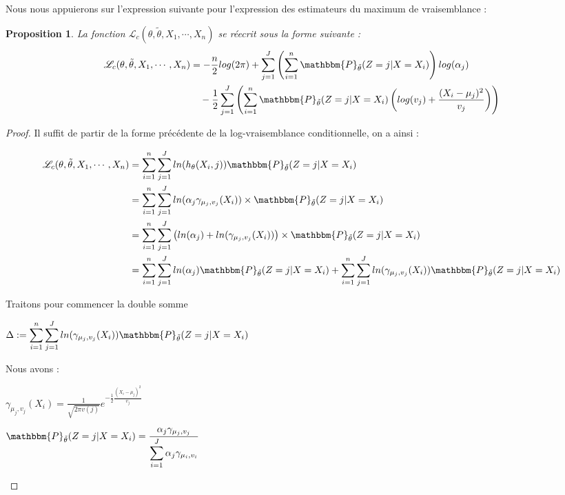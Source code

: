 \documentclass[frenchb]{report}
\newcommand{\1}{\mathbbm{1}}
\newcommand{\prob}{\mathbbm{P}}
\newcommand{\lv}{\mathcal{L}}
\newcommand{\thetat}{\tilde{\theta}}
\newtheorem{prop}{Proposition}
\theoremstyle{definition}\newtheorem{defn}{Définition}
\theoremstyle{definition}\newtheorem{exm}{Exemple}
\theoremstyle{definition}\newtheorem{nota}{Notation}
\theoremstyle{definition}\newtheorem{rem}{Remarque}
\begin{document}
Nous nous appuierons sur l'expression suivante pour l'expression des estimateurs du maximum de vraisemblance :

\begin{prop} La fonction $\lv_{c}(\theta, \thetat, X_1, \cdots, X_n)$ se réecrit sous la forme suivante : 
\begin{align*}
 \lv_{c}(\theta, \thetat, X_1, \cdots, X_n) &= -\frac{n}{2}log(2\pi)+\sum_{j=1}^J \left(\sum_{i = 1}^n \prob_{\thetat}(Z= j|X=X_i)\right) log(\alpha_j)\\
&~~~-\frac{1}{2}\sum_{j=1}^J\left(\sum_{i=1}^n  \prob_{\thetat}(Z=j|X=X_i)\left(log(v_j)+\frac{(X_i-\mu_j)^2}{v_j}\right)\right)
\end{align*}
\end{prop}

\begin{proof}
Il suffit de partir de la forme précédente de la log-vraisemblance conditionnelle, on a ainsi : 

\begin{align*}
 \lv_{c}(\theta, \thetat, X_1, \cdots, X_n) &= \sum_{i=1}^n \sum_{j = 1}^J ln(h_\theta(X_i,j)) \prob_{\thetat} (Z = j|X = X_i)\\
&= \sum_{i=1}^n \sum_{j = 1}^J ln(\alpha_j\gamma_{\mu_j,v_j}(X_i))\times \prob_{\thetat} (Z = j|X = X_i)\\
&= \sum_{i=1}^n \sum_{j = 1}^J \left(ln(\alpha_j)+ln(\gamma_{\mu_j,v_j}(X_i))\right)\times \prob_{\thetat} (Z = j|X = X_i)\\
&= \sum_{i=1}^n \sum_{j = 1}^J ln(\alpha_j)\prob_{\thetat} (Z = j|X = X_i)+\sum_{i=1}^n \sum_{j = 1}^J ln(\gamma_{\mu_j,v_j}(X_i))\prob_{\thetat} (Z = j|X = X_i)\\
\end{align*}

Traitons pour commencer la double somme 
\begin{center} $\Delta := \displaystyle \sum_{i=1}^n \sum_{j = 1}^J ln(\gamma_{\mu_j,v_j}(X_i))\prob_{\thetat} (Z = j|X = X_i)$ \end{center}

Nous avons :
\begin{center}
$\gamma_{\mu_j,v_j}(X_i) = \frac{1}{\sqrt{2 \pi v(j)}}e^{-\frac{1}{2}\frac{(X_i - \mu_j)^2}{v_j}}$
\end{center}
\begin{center}
$\prob_{\thetat} (Z = j|X = X_i) = \displaystyle \frac{\alpha_j\gamma_{\mu_j,v_j}}{\displaystyle\sum_{i=1}^J \alpha_j\gamma_{\mu_i,v_i}}$
\end{center}



\end{proof}
\end{document}
